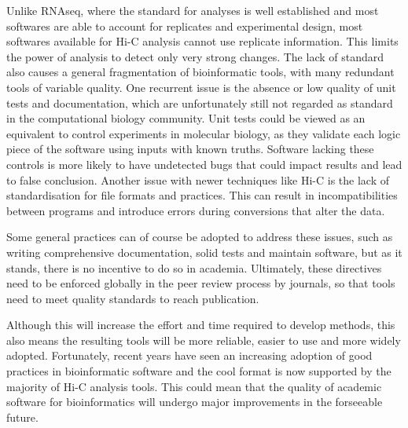 
Unlike RNAseq, where the standard for analyses is well established and most softwares are able to account for replicates and experimental design, most softwares available for Hi-C analysis cannot use replicate information. This limits the power of analysis to detect only very strong changes. The lack of standard also causes a general fragmentation of bioinformatic tools, with many redundant tools of variable quality. One recurrent issue is the absence or low quality of unit tests and documentation, which are unfortunately still not regarded as standard in the computational biology community. Unit tests could be viewed as an equivalent to control experiments in molecular biology, as they validate each logic piece of the software using inputs with known truths. Software lacking these controls is more likely to have undetected bugs that could impact results and lead to false conclusion.
Another issue with newer techniques like Hi-C is the lack of standardisation for file formats and practices. This can result in incompatibilities between programs and introduce errors during conversions that alter the data.

Some general practices can of course be adopted to address these issues, such as writing comprehensive documentation, solid tests and maintain software, but as it stands, there is no incentive to do so in academia. Ultimately, these directives need to be enforced globally in the peer review process by journals, so that tools need to meet quality standards to reach publication.

Although this will increase the effort and time required to develop methods, this also means the resulting tools will be more reliable, easier to use and more widely adopted. Fortunately, recent years have seen an increasing adoption of good practices in bioinformatic software and the cool format is now supported by the majority of Hi-C analysis tools. This could mean that the quality of academic software for bioinformatics will undergo major improvements in the forseeable future. 
